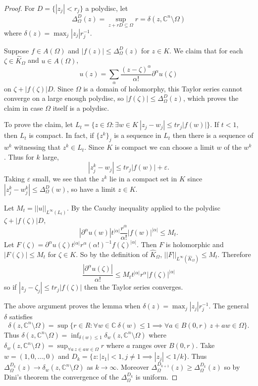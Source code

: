 \documentclass[12pt]{report}
\newcommand{\CC}{\mathbb{C}}
\theoremstyle{definition}
\begin{document}
\begin{proof}
    For $D = \{|z_j| < r_j\}$ a polydisc, let
    $$\Delta_\Omega^D(z) = \sup_{z + rD \subseteq \Omega} r = \delta(z, \CC^n \setminus \Omega)$$
    where $\delta(z) = \max_j |z_j|r_j^{-1}$.

    Suppose $f \in A(\Omega)$ and $|f(z)| \leq \Delta_\Omega^D(z)$ for $z \in K$. We claim that for each $\zeta \in \hat K_\Omega$ and $u \in A(\Omega)$,
    $$u(z) = \sum_\alpha \frac{(z - \zeta)^\alpha}{\alpha!} \partial^\alpha u(\zeta)$$
    on $\zeta + |f(\zeta)|D$. Since $\Omega$ is a domain of holomorphy, this Taylor series cannot converge on a large enough polydisc, so $|f(\zeta)| \leq \Delta_\Omega^D(z)$, which proves the claim in case $\Omega$ itself is a polydisc.

    To prove the claim, let $L_t = \{z \in \Omega: \exists w \in K~|z_j - w_j| \leq tr_j|f(w)|\}$. If $t < 1$, then $L_t$ is compact. In fact, if $\{z^k\}_j$ is a sequence in $L_t$ then there is a sequence of $w^k$ witnessing that $z^k \in L_t$. Since $K$ is compact we can choose a limit $w$ of the $w^k$. Thus for $k$ large,
    $$|z^k_j - w_j| \leq tr_j |f(w)| + \varepsilon.$$
    Taking $\varepsilon$ small, we see that the $z^k$ lie in a compact set in $K$ since $|z_j^k - w_j^k| \leq \Delta_\Omega^D(w)$, so have a limit $z \in K$.

    Let $M_t = ||u||_{L^\infty(L_t)}$. By the Cauchy inequality applied to the polydisc $\zeta + |f(\zeta)|D$,
    $$|\partial^\alpha u(w)| t^{|\alpha|} \frac{r^\alpha}{\alpha!} |f(w)|^{|\alpha|} \leq M_t.$$
    Let $F(\zeta) = \partial^\alpha u(\zeta) t^{|\alpha|} r^\alpha (\alpha!)^{-1} f(\zeta)^{|\alpha|}$. Then $F$ is holomorphic and $|F(\zeta)| \leq M_t$ for $\zeta \in K$. So by the definition of $\hat K_\Omega$, $||F||_{L^\infty(\hat K_\Omega)} \leq M_t$. Therefore
    $$\frac{|\partial^\alpha u(\zeta)|}{\alpha!} \leq M_t t^{|\alpha|} r^\alpha |f(\zeta)|^{|\alpha|}$$
    so if $|z_j - \zeta_j| \leq tr_j |f(\zeta)|$ then the Taylor series converges.

    The above argument proves the lemma when $\delta(z) = \max_j |z_j|r_j^{-1}$. The general $\delta$ satisfies
    $$\delta(z, \CC^n \setminus \Omega) = \sup \{r \in R: \forall w \in \CC ~\delta(w) \leq 1 \implies \forall a \in B(0, r) ~z + aw \in \Omega\}.$$
    Thus $\delta(z, \CC^n \setminus \Omega) = \inf_{\delta(w) \leq 1} \delta_w(z, \CC^n \setminus \Omega)$ where $\delta_w(z, \CC^n \setminus \Omega) = \sup_{\forall a ~z \in aw \in \Omega} r$ where $a$ ranges over $B(0, r)$. Take $w = (1, 0, \dots, 0)$ and $D_k = \{z: |z_1| < 1, j \neq 1 \implies |z_j| < 1/k\}$. Thus $\Delta^{D_k}_\Omega(z) \to \delta_w(z, \CC^n \setminus \Omega)$ as $k \to \infty$. Moreover $\Delta^{D_{k+1}}_\Omega(z) \geq \Delta^{D_k}_\Omega(z)$ so by Dini's theorem the convergence of the $\Delta^{D_k}_\Omega$ is uniform.


\end{proof}
\end{document}
